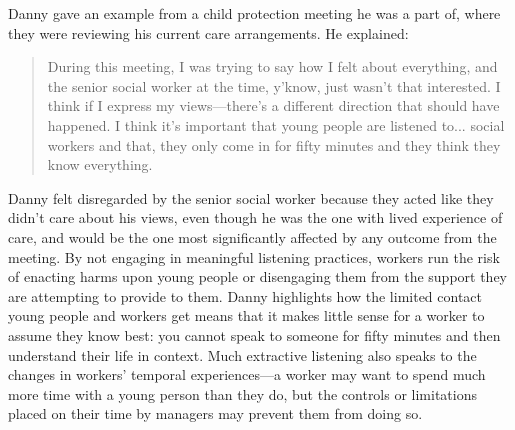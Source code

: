 Danny gave an example from a child protection meeting he was a part of, where they were reviewing his current care arrangements. He explained:
\begin{quote}
During this meeting, I was trying to say how I felt about everything, and the senior social worker at the time, y'know, just wasn't that interested. I think if I express my views—there's a different direction that should have happened. I think it's important that young people are listened to... social workers and that, they only come in for fifty minutes and they think they know everything.
\end{quote}
Danny felt disregarded by the senior social worker because they acted like they didn't care about his views, even though he was the one with lived experience of care, and would be the one most significantly affected by any outcome from the meeting. By not engaging in meaningful listening practices, workers run the risk of enacting harms upon young people or disengaging them from the support they are attempting to provide to them. Danny highlights how the limited contact young people and workers get means that it makes little sense for a worker to assume they know best: you cannot speak to someone for fifty minutes and then understand their life in context. Much extractive listening also speaks to the changes in workers' temporal experiences—a worker may want to spend much more time with a young person than they do, but the  controls or limitations placed on their time by managers may prevent them from doing so.


